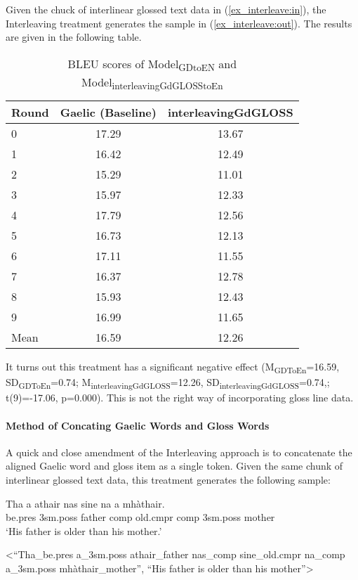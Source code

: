 \documentclass[a4paper]{article}
\begin{document}
Given the chuck of interlinear glossed text data in (\ref{ex_interleave:in}), the Interleaving treatment generates the sample in (\ref{ex_interleave:out}).  
The results are given in the following table. 
\begin{table}[ht]
\centering
\begin{tabular}{lcc}
  \hline
Round & Gaelic (Baseline) & interleavingGdGLOSS \\ 
  \hline
0 & 17.29 & 13.67 \\ 
  1 & 16.42 & 12.49 \\ 
  2 & 15.29 & 11.01 \\ 
  3 & 15.97 & 12.33 \\ 
  4 & 17.79 & 12.56 \\ 
  5 & 16.73 & 12.13 \\ 
  6 & 17.11 & 11.55 \\ 
  7 & 16.37 & 12.78 \\ 
  8 & 15.93 & 12.43 \\ 
  9 & 16.99 & 11.65 \\ 
   \hline
Mean & 16.59 & 12.26 \\ 
   \hline
\end{tabular}
\caption{BLEU scores of Model\textsubscript{GDtoEN} and Model\textsubscript{interleavingGdGLOSStoEn}} 
\label{Table:interleavingGdGLOSS}
\end{table}\newline
It turns out this treatment has a significant negative effect
(M\textsubscript{GDToEn}=16.59, SD\textsubscript{GDToEn}=0.74; M\textsubscript{interleavingGdGLOSS}=12.26, SD\textsubscript{interleavingGdGLOSS}=0.74,; t(9)=-17.06, p=0.000). This is not the right way of incorporating gloss line data. 


\paragraph{Method of Concating Gaelic Words and Gloss Words }\label{treatment:Concating}
A quick and close amendment of the Interleaving approach is to concatenate the aligned Gaelic word and gloss item as a single token. Given the same chunk of interlinear glossed text data, this treatment generates the following sample:

\begin{exe} 
\ex 
	\begin{xlist}
	\ex 
		\gll	 Tha a athair nas sine na a mh\`athair.\\  
     		     be.pres 3sm.poss father comp old.cmpr comp 3sm.poss mother \\
    	\glt    `His father is older than his mother.'  

    \ex <``Tha\_be.pres a\_3sm.poss athair\_father nas\_comp sine\_old.cmpr na\_comp a\_3sm.poss mh\`athair\_mother'', ``His father is older than his mother''>
    \end{xlist}
\end{exe}
\end{document}
